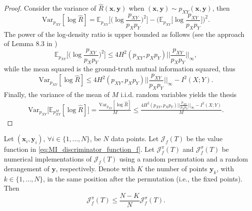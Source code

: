 \begin{proof}
Consider the variance of $\hat{R}(\mathbf{x},\mathbf{y})$ when $(\mathbf{x},\mathbf{y})\sim p_{XY}(\mathbf{x},\mathbf{y})$, then
\begin{equation}
\text{Var}_{p_{XY}}[\log \hat{R}] = \mathbb{E}_{p_{XY}}\biggl[\biggl(\log \frac{p_{XY}}{p_Xp_Y}\biggr)^2\biggr] - \biggl(\mathbb{E}_{p_{XY}}\biggl[\log \frac{p_{XY}}{p_Xp_Y}\biggr]\biggr)^2.
\end{equation}
The power of the log-density ratio is upper bounded as follows (see the approach of Lemma 8.3 in \cite{Ghosal2000})
\begin{equation}
\mathbb{E}_{p_{XY}}\biggl[\biggl(\log \frac{p_{XY}}{p_Xp_Y}\biggr)^2\biggr] \leq 4H^2(p_{XY},p_Xp_Y)\biggl|\biggl|\frac{p_{XY}}{p_Xp_Y}\biggr|\biggr|_{\infty},
\end{equation}
while the mean squared is the ground-truth mutual information squared, thus
\begin{equation}
\text{Var}_{p_{XY}}[\log \hat{R}] \leq 4H^2(p_{XY},p_Xp_Y)\biggl|\biggl|\frac{p_{XY}}{p_Xp_Y}\biggr|\biggr|_{\infty} - I^2(X;Y).
\end{equation}
Finally, the variance of the mean of $M$ i.i.d. random variables yields the thesis
\begin{align}
\text{Var}_{p_{XY}}\bigl[\mathbb{E}_{p^M_{XY}} [\log \hat{R}] \bigr]  = \frac{\text{Var}_{p_{XY}}[\log \hat{R}]}{M}  \leq \frac{ 4H^2(p_{XY},p_Xp_Y)\biggl|\biggl|\frac{p_{XY}}{p_Xp_Y}\biggr|\biggr|_{\infty}-I^2(X;Y)}{M}.
\end{align}
\end{proof}

\begin{lemma}
Let $(\mathbf{x}_i,\mathbf{y}_i)$, $\forall i\in \{1,\dots,N\}$, be $N$ data points. Let $\mathcal{J}_{f}(T)$ be the value function in \eqref{eq:MI_discriminator_function_f}. Let $\mathcal{J}_{f}^{\pi}(T)$ and $\mathcal{J}_{f}^{\sigma}(T)$ be numerical implementations of $\mathcal{J}_{f}(T)$ using a random permutation and a random derangement of $\mathbf{y}$, respectively. Denote with $K$ the number of points $\mathbf{y}_k$, with $k \in \{1,\dots, N\}$, in the same position after the permutation (i.e., the fixed points). Then
\begin{equation}
\mathcal{J}_{f}^{\pi}(T) \leq \frac{N-K}{N} \mathcal{J}_{f}^{\sigma}(T).
\end{equation}
\end{lemma}

